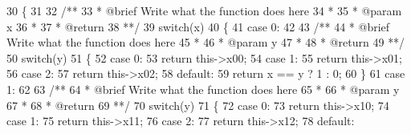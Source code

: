 \begin{DoxyCode}
30         \{
31 \textcolor{comment}{}
32 \textcolor{comment}{            /**}
33 \textcolor{comment}{             * @brief Write what the function does here}
34 \textcolor{comment}{             *}
35 \textcolor{comment}{             * @param x}
36 \textcolor{comment}{             *}
37 \textcolor{comment}{             * @return}
38 \textcolor{comment}{             **/}
39             \textcolor{keywordflow}{switch}(x)
40             \{
41                 \textcolor{keywordflow}{case} 0:
42 \textcolor{comment}{}
43 \textcolor{comment}{                    /**}
44 \textcolor{comment}{                     * @brief Write what the function does here}
45 \textcolor{comment}{                     *}
46 \textcolor{comment}{                     * @param y}
47 \textcolor{comment}{                     *}
48 \textcolor{comment}{                     * @return}
49 \textcolor{comment}{                     **/}
50                     \textcolor{keywordflow}{switch}(y)
51                     \{
52                         \textcolor{keywordflow}{case} 0:
53                             \textcolor{keywordflow}{return} this->x00;
54                         \textcolor{keywordflow}{case} 1:
55                             \textcolor{keywordflow}{return} this->x01;
56                         \textcolor{keywordflow}{case} 2:
57                             \textcolor{keywordflow}{return} this->x02;
58                         \textcolor{keywordflow}{default}:
59                             \textcolor{keywordflow}{return} x == y ? 1 : 0;
60                     \}
61                 \textcolor{keywordflow}{case} 1:
62 \textcolor{comment}{}
63 \textcolor{comment}{                    /**}
64 \textcolor{comment}{                     * @brief Write what the function does here}
65 \textcolor{comment}{                     *}
66 \textcolor{comment}{                     * @param y}
67 \textcolor{comment}{                     *}
68 \textcolor{comment}{                     * @return}
69 \textcolor{comment}{                     **/}
70                     \textcolor{keywordflow}{switch}(y)
71                     \{
72                         \textcolor{keywordflow}{case} 0:
73                             \textcolor{keywordflow}{return} this->x10;
74                         \textcolor{keywordflow}{case} 1:
75                             \textcolor{keywordflow}{return} this->x11;
76                         \textcolor{keywordflow}{case} 2:
77                             \textcolor{keywordflow}{return} this->x12;
78                         \textcolor{keywordflow}{default}:

\end{DoxyCode}
